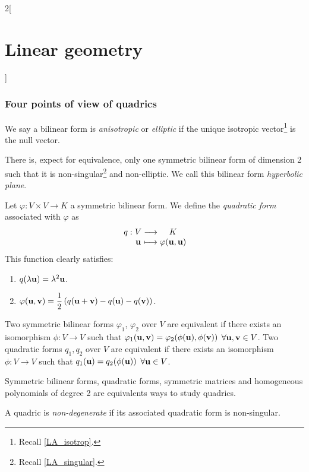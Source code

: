 \documentclass[../../../main.tex]{subfiles}
\begin{document}
\begin{multicols}{2}[\section{Linear geometry}]
  \subsubsection{Four points of view of quadrics}
  \begin{definition}
    We say a bilinear form is \emph{anisotropic} or \emph{elliptic} if the unique isotropic vector\footnote{Recall \cref{LA_isotrop}.} is the null vector.
  \end{definition}
  \begin{theorem}
    There is, expect for equivalence, only one symmetric bilinear form of dimension 2 such that it is non-singular\footnote{Recall \cref{LA_singular}.} and non-elliptic. We call this bilinear form \emph{hyperbolic plane}.
  \end{theorem}
  \begin{definition}
    Let $\varphi:V\times V\rightarrow K$ a symmetric bilinear form. We define the \emph{quadratic form} associated with $\varphi$ as
    $$
      \function{q}{V}{K}{\vf{u}}{\varphi(\vf{u},\vf{u})}
    $$
    This function clearly satisfies:
    \begin{enumerate}
      \item $q(\lambda\boldsymbol{\mathrm{u}})=\lambda^2\boldsymbol{\mathrm{u}}$.
      \item $\displaystyle\varphi(\boldsymbol{\mathrm{u}},\boldsymbol{\mathrm{v}})=\frac{1}{2}\left(q(\boldsymbol{\mathrm{u}}+\boldsymbol{\mathrm{v}})-q(\boldsymbol{\mathrm{u}})-q(\boldsymbol{\mathrm{v}})\right)$.
    \end{enumerate}
  \end{definition}
  \begin{proposition}
    Two symmetric bilinear forms $\varphi_1$, $\varphi_2$ over $V$ are equivalent if there exists an isomorphism $\phi:V\rightarrow V$ such that $\varphi_1(\boldsymbol{\mathrm{u}},\boldsymbol{\mathrm{v}})=\varphi_2(\phi(\boldsymbol{\mathrm{u}}),\phi(\boldsymbol{\mathrm{v}}))$ $\forall\boldsymbol{\mathrm{u}},\boldsymbol{\mathrm{v}}\in V$.\newline
    Two quadratic forms $q_1,q_2$ over $V$ are equivalent if there exists an isomorphism $\phi:V\rightarrow V$ such that $q_1(\boldsymbol{\mathrm{u}})=q_2(\phi(\boldsymbol{\mathrm{u}}))$ $\forall\boldsymbol{\mathrm{u}}\in V$.
  \end{proposition}
  \begin{theorem}
    Symmetric bilinear forms, quadratic forms, symmetric matrices and homogeneous polynomials of degree 2 are equivalents ways to study quadrics.
  \end{theorem}
  \begin{definition}
    A quadric is \emph{non-degenerate} if its associated quadratic form is non-singular.
  \end{definition}

\end{multicols}
\end{document}
